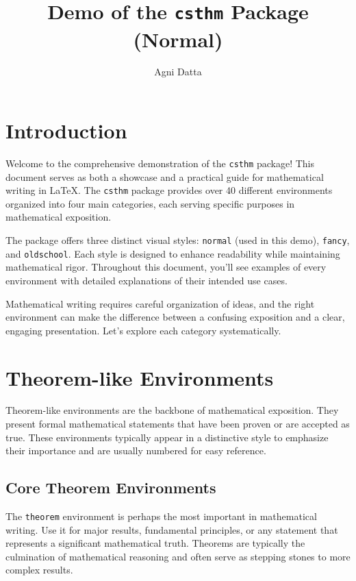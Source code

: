 \documentclass[9pt]{amsart}
\title{Demo of the \texttt{csthm} Package (Normal)}
\author{Agni Datta}
\begin{document}
\maketitle

\tableofcontents

\section{Introduction}

Welcome to the comprehensive demonstration of the \texttt{csthm} package! This
document serves as both a showcase and a practical guide for mathematical
writing in \LaTeX. The \texttt{csthm} package provides over 40 different
environments organized into four main categories, each serving specific
purposes in mathematical exposition.

The package offers three distinct visual styles: \texttt{normal} (used in this
demo), \texttt{fancy}, and \texttt{oldschool}. Each style is designed to
enhance readability while maintaining mathematical rigor. Throughout this
document, you'll see examples of every environment with detailed explanations
of their intended use cases.

Mathematical writing requires careful organization of ideas, and the right
environment can make the difference between a confusing exposition and a clear,
engaging presentation. Let's explore each category systematically.

\section{Theorem-like Environments}

Theorem-like environments are the backbone of mathematical exposition. They
present formal mathematical statements that have been proven or are accepted as
true. These environments typically appear in a distinctive style to emphasize
their importance and are usually numbered for easy reference.

\subsection{Core Theorem Environments}

The \texttt{theorem} environment is perhaps the most important in mathematical
writing. Use it for major results, fundamental principles, or any statement
that represents a significant mathematical truth. Theorems are typically the
culmination of mathematical reasoning and often serve as stepping stones to
more complex results.
\end{document}
